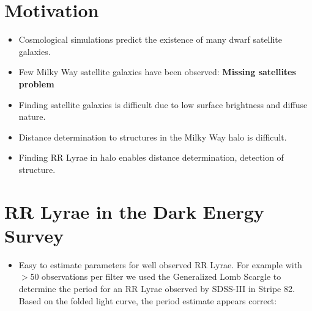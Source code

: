 \documentclass[a0,portrait]{a0poster}
\begin{document}
\begin{multicols}{2} %



\section*{Motivation}

\begin{itemize}
\item Cosmological simulations predict the existence of many dwarf satellite galaxies.
\item Few Milky Way satellite galaxies have been observed: \textbf{Missing satellites problem} \cite{kauffmann1993formation,klypin1999missing,moore1999dark}
\item Finding satellite galaxies is difficult due to low surface brightness and diffuse nature.
\item Distance determination to structures in the Milky Way halo is difficult.
\item Finding RR Lyrae in halo enables distance determination, detection of structure. \cite{baker2015charting}
\end{itemize}



\section*{RR Lyrae in the Dark Energy Survey}

\begin{itemize}
\item Easy to estimate parameters for well observed RR Lyrae. For example with $>50$ observations per filter we used the Generalized Lomb Scargle to determine the period for an RR Lyrae observed by SDSS-III in Stripe 82. Based on the folded light curve, the period estimate appears correct:


\end{itemize}
\end{multicols}
\end{document}
